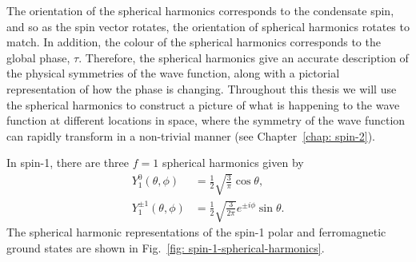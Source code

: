 The orientation of the spherical harmonics corresponds to the condensate spin,
and so as the spin vector rotates, the orientation of spherical harmonics
rotates to match.
In addition, the colour of the spherical harmonics corresponds to the global
phase, \( \tau \).
Therefore, the spherical harmonics give an accurate description of the
physical symmetries of the wave function, along with a pictorial representation
of how the phase is changing.
Throughout this thesis we will use the spherical harmonics to construct a
picture of what is happening to the wave function at different locations in
space, where the symmetry of the wave function can rapidly transform in a
non-trivial manner (see Chapter~\ref{chap: spin-2}).

In spin-1, there are three \(f = 1\) spherical harmonics given by
\begin{align}
    Y_1^0(\theta, \phi)       & = \frac{1}{2}\sqrt{\frac{3}{\pi}}\cos\theta, \\
    Y_1^{\pm 1}(\theta, \phi) & =
    \frac{1}{2}\sqrt{\frac{3}{2\pi}}e^{\pm i \phi}\sin\theta.
\end{align}
The spherical harmonic representations of the spin-1 polar and ferromagnetic
ground states are shown in Fig.~\ref{fig: spin-1-spherical-harmonics}.
